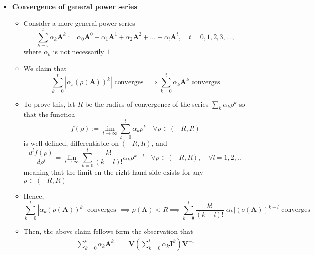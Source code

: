 \documentclass[12pt,a4paper]{article}
\begin{document}
\begin{itemize}
\item \textbf{Convergence of general power series}
  \begin{itemize}
  \item Consider a more general power series
    \begin{equation}\nonumber%
      \sum_{k=0}^{t}\alpha_{k}\bm{A}^{k}
      := \alpha_{0}\bm{A}^{0} + \alpha_{1}\bm{A}^{1} + \alpha_{2}\bm{A}^{2} + \ldots + \alpha_{t}\bm{A}^{t},
      \quad
      t = 0, 1, 2, 3, \ldots,
    \end{equation}
    where $\alpha_{k}$ is not necessarily $1$
  \item We claim that
    \begin{equation}\nonumber%
      \sum_{k=0}^{t}|\alpha_{k}(\rho(\bm{A}))^{k}| \text{ converges }
      \implies
      \sum_{k=0}^{t}\alpha_{k}\bm{A}^{k} \text{ converges}
    \end{equation}
  \item To prove this, let $R$ be the radius of convergence of the series $\sum_{k} \alpha_{k}\rho^{k}$ so that
    the function
    \begin{equation}\nonumber%
      f(\rho) :=
      \lim_{t\to\infty}\sum_{k=0}^{t} \alpha_{k}\rho^{k}
      \quad \forall \rho \in (-R, R)
    \end{equation}
    is well-defined, differentiable on $(-R, R)$, and
    \begin{equation}\nonumber%
      \frac{d^{l} f(\rho)}{d\rho^{l}} = 
      \lim_{t\to\infty}\sum_{k=0}^{t} \frac{k!}{(k-l)!}\alpha_{k}\rho^{k-l}
      \quad \forall \rho \in (-R, R),
      \quad \forall l=1,2,\ldots
    \end{equation}
    meaning that the limit on the right-hand side exists for any $\rho \in (-R, R)$
  \item Hence,
    \begin{equation}\nonumber%
      \sum_{k=0}^{t}|\alpha_{k}(\rho(\bm{A}))^{k}| \text{ converges }
      \implies
      \rho(\bm{A}) < R
      \implies
      \sum_{k=0}^{t} \frac{k!}{(k-l)!}|\alpha_{k}|(\rho(\bm{A}))^{k-l}
      \text{ converges }
    \end{equation}
  \item Then, the above claim follows form the observation that
    \begin{align}
      \sum_{k=0}^{t}\alpha_{k}\bm{A}^{k}
        & = \bm{V}\left(\sum_{k=0}^{t}\alpha_{k}\bm{J}^{k}\right)\bm{V}^{-1} \nonumber \\

\end{align}
\end{itemize}
\end{itemize}
\end{document}
